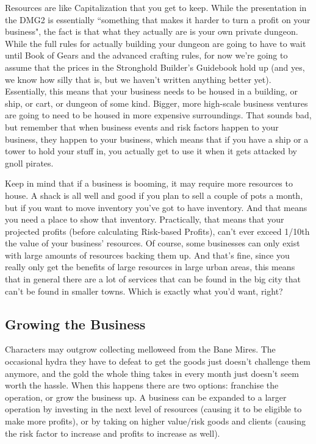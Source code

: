 Resources are like Capitalization that you get to keep. While the presentation in the DMG2 is essentially ``something that makes it harder to turn a profit on your business", the fact is that what they actually are is your own private dungeon. While the full rules for actually building your dungeon are going to have to wait until Book of Gears and the advanced crafting rules, for now we're going to assume that the prices in the Stronghold Builder's Guidebook hold up (and yes, we know how silly that is, but we haven't written anything better yet). Essentially, this means that your business needs to be housed in a building, or ship, or cart, or dungeon of some kind. Bigger, more high-scale business ventures are going to need to be housed in more expensive surroundings. That sounds bad, but remember that when business events and risk factors happen to your business, they happen to your business, which means that if you have a ship or a tower to hold your stuff in, you actually get to use it when it gets attacked by gnoll pirates.

Keep in mind that if a business is booming, it may require more resources to house. A shack is all well and good if you plan to sell a couple of pots a month, but if you want to move inventory you've got to have inventory. And that means you need a place to show that inventory. Practically, that means that your projected profits (before calculating Risk-based Profits), can't ever exceed 1/10th the value of your business' resources. Of course, some businesses can only exist with large amounts of resources backing them up. And that's fine, since you really only get the benefits of large resources in large urban areas, this means that in general there are a lot of services that can be found in the big city that can't be found in smaller towns. Which is exactly what you'd want, right?

\subsection{Growing the Business}

Characters may outgrow collecting melloweed from the Bane Mires. The occasional hydra they have to defeat to get the goods just doesn't challenge them anymore, and the gold the whole thing takes in every month just doesn't seem worth the hassle. When this happens there are two options: franchise the operation, or grow the business up. A business can be expanded to a larger operation by investing in the next level of resources (causing it to be eligible to make more profits), or by taking on higher value/risk goods and clients (causing the risk factor to increase and profits to increase as well).

